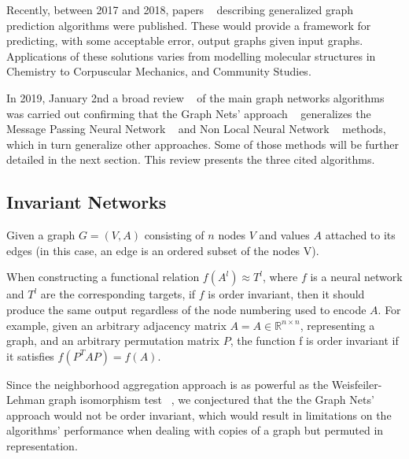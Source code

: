 Recently, between 2017 and 2018, papers ~\cite{Battaglia_2018, Gilmer_2017, Wang_2018} describing generalized graph prediction algorithms were published. These would provide a framework for predicting, with some acceptable error, output graphs given input graphs. Applications of these solutions varies from modelling molecular structures in Chemistry to Corpuscular Mechanics, and Community Studies.

In 2019, January 2nd a broad review ~\cite{Zhou_2019} of the main graph networks algorithms was carried out confirming that the Graph Nets’ approach ~\cite{Battaglia_2018} generalizes the Message Passing Neural Network ~\cite{Gilmer_2017} and Non Local Neural Network ~\cite{Wang_2018} methods, which in turn generalize other approaches. Some of those methods will be further detailed in the next section. This review presents the three cited algorithms. 


\subsection{Invariant Networks}

Given a graph $G = (V, A)$ consisting of $n$ nodes $V$ and values $A$ attached to its edges (in this case, an edge is an ordered subset of the nodes V).

When constructing a functional relation $f(A^l) \approx T^l$, where $f$ is a neural network and $T^l$ are the corresponding targets, if $f$ is order invariant, then it should produce the same output regardless of the node numbering used to encode $A$. For example, given an arbitrary adjacency matrix $A = A \in \mathds{R}^{n \times n}$, representing a graph, and an arbitrary permutation matrix $P$, the function f is order invariant if it satisfies $f(P^T A P) = f(A)$.

Since the neighborhood aggregation approach is as powerful as the Weisfeiler-Lehman graph isomorphism test ~\cite{Xu_2018}, we conjectured that the the Graph Nets’ approach would not be order invariant, which would result in limitations on the algorithms’ performance when dealing with copies of a graph but permuted in representation. 